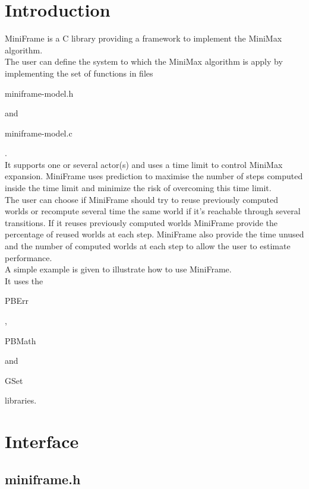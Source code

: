 \section*{Introduction}

MiniFrame is a C library providing a framework to implement the MiniMax algorithm.\\ 

The user can define the system to which the MiniMax algorithm is apply by implementing the set of functions in files \begin{ttfamily}miniframe-model.h\end{ttfamily} and \begin{ttfamily}miniframe-model.c\end{ttfamily}.\\

It supports one or several actor(s) and uses a time limit to control MiniMax expansion. MiniFrame uses prediction to maximise the number of steps computed inside the time limit and minimize the risk of overcoming this time limit.\\

The user can choose if MiniFrame should try to reuse previously computed worlds or recompute several time the same world if it's reachable through several transitions. If it reuses previously computed worlds MiniFrame provide the percentage of reused worlds at each step. MiniFrame also provide the time unused and the number of computed worlds at each step to allow the user to estimate performance.\\

A simple example is given to illustrate how to use MiniFrame.\\

It uses the \begin{ttfamily}PBErr\end{ttfamily}, \begin{ttfamily}PBMath\end{ttfamily} and \begin{ttfamily}GSet\end{ttfamily} libraries.\\

\section{Interface}

\subsection{miniframe.h}

